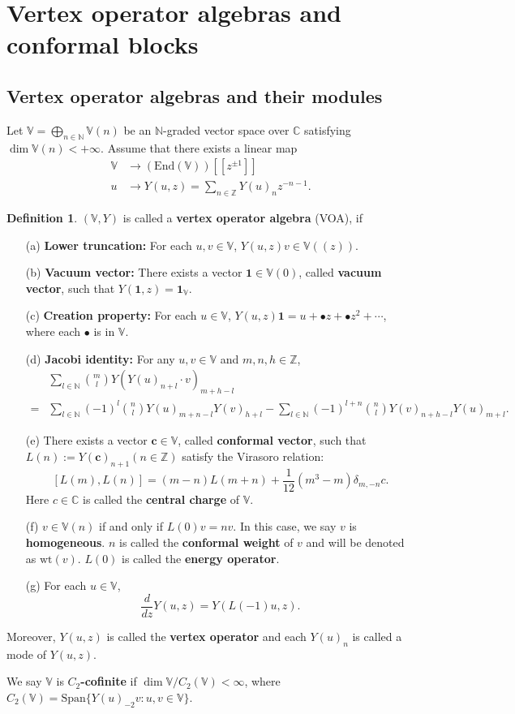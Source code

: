 \documentclass[11pt,b5paper,notitlepage]{article}
\theoremstyle{definition}
\newtheorem{df}{Definition}[subsection]
\theoremstyle{plain}
\newcommand{\End}{\mathrm{End}} %
\newcommand{\Span}{\mathrm{Span}}
\newcommand{\Vbb}{\mathbb V}
\newcommand{\Cbb}{\mathbb C}
\newcommand{\Nbb}{\mathbb N}
\newcommand{\Zbb}{\mathbb Z}
\newcommand{\cbf}{\mathbf c}
\newcommand{\wt}{\mathrm{wt}}
\newcommand{\ibf}{\mathbf 1}
\newcommand{\<}{\left\langle}
\renewcommand{\>}{\right\rangle}
\numberwithin{equation}{subsection}
\begin{document}
\section{Vertex operator algebras and conformal blocks}
\subsection{Vertex operator algebras and their modules}
Let $\Vbb=\bigoplus_{n\in \Nbb}\Vbb(n)$ be an $\Nbb$-graded vector space over $\Cbb$ satisfying $\dim \Vbb(n)<+\infty$. Assume that there exists a linear map 
$$
\begin{aligned}
    \Vbb&\rightarrow (\End(\Vbb))[[z^{\pm 1}]]\\
    u&\rightarrow Y(u,z)=\sum_{n\in \Zbb} Y(u)_nz^{-n-1}.
\end{aligned}
$$
\begin{df}
    $(\Vbb,Y)$ is called a \textbf{vertex operator algebra} (VOA), if 
    \begin{enumerate}
        \item[(a)]\textbf{Lower truncation:} For each $u,v\in \Vbb$, $Y(u,z)v\in \Vbb((z))$.
        \item[(b)]\textbf{Vacuum vector:} There exists a vector $\ibf\in \Vbb(0)$, called \textbf{vacuum vector}, such that $Y(\ibf,z)=\ibf_\Vbb$.
        \item[(c)]\textbf{Creation property:} For each $u\in \Vbb$, $Y(u,z)\ibf=u+\bullet z+\bullet z^2+\cdots$, where each $\bullet$ is in $\Vbb$.
        \item[(d)]\textbf{Jacobi identity:} For any $u,v\in \Vbb$ and $m,n,h\in \Zbb$, 
        $$
        \begin{aligned}
        &\sum_{l\in \Nbb}\binom{m}{l}Y(Y(u)_{n+l}\cdot v)_{m+h-l}\\
        =&\sum_{l\in \Nbb}(-1)^l \binom{n}{l}Y(u)_{m+n-l}Y(v)_{h+l}-\sum_{l\in \Nbb}(-1)^{l+n}\binom{n}{l}Y(v)_{n+h-l}Y(u)_{m+l}.
        \end{aligned}
        $$
        \item[(e)]There exists a vector $\cbf\in \Vbb$, called \textbf{conformal vector}, such that $L(n):=Y(\cbf)_{n+1}(n\in \Zbb)$ satisfy the Virasoro relation:
        $$
        [L(m),L(n)]=(m-n)L(m+n)+\frac{1}{12}(m^3-m)\delta_{m,-n}c.
        $$
        Here $c\in \Cbb$ is called the \textbf{central charge} of $\Vbb$.
        \item[(f)]$v\in \Vbb(n)$ if and only if $L(0)v=nv$. In this case, we say $v$ is \textbf{homogeneous}. $n$ is called the \textbf{conformal weight} of $v$ and will be denoted as $\wt(v)$. $L(0)$ is called the \textbf{energy operator}.
        \item[(g)]For each $u\in \Vbb$, 
        $$
        \frac{d}{dz}Y(u,z)=Y(L(-1)u,z).
        $$
    \end{enumerate}
    Moreover, $Y(u,z)$ is called the \textbf{vertex operator} and each $Y(u)_n$ is called a mode of $Y(u,z)$. 
\end{df}
We say $\Vbb$ is \textbf{$C_2$-cofinite} if $\dim \Vbb/C_2(\Vbb)<\infty$, where $C_2(\Vbb)=\Span\{Y(u)_{-2}v:u,v\in \Vbb\}$.   
 
\end{document}
